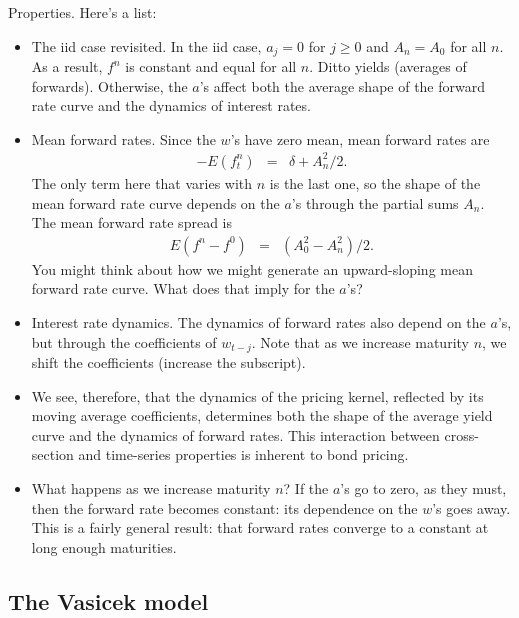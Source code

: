 \documentclass[11pt]{article}
\begin{document}
Properties.
Here's a list:
\begin{itemize}
\item The iid case revisited.
In the iid case, $a_j = 0$ for $j\geq 0$ and $A_n = A_0$ for all $n$.
As a result, $f^n$ is constant and equal for all $n$.
Ditto yields (averages of forwards).
Otherwise, the $a$'s affect both
the average shape of the forward rate curve
and the dynamics of interest rates.
\item Mean forward rates.
Since the $w$'s have zero mean, mean forward rates are
\begin{eqnarray*}
  -  E( f^n_t)
            &=&  \delta + A_n^2/2 .
\end{eqnarray*}
The only term here that varies with $n$ is the last one,
so the shape of the mean forward rate curve depends on the $a$'s through
the partial sums $A_n$.
The mean forward rate spread is
\begin{eqnarray}
    E( f^n - f^0 )
            &=&  (A_0^2 - A_n^2)/2 .
            \label{eq:vasicek-mean-forwards}
\end{eqnarray}
You might think about how we might generate an upward-sloping mean forward
rate curve.  What does that imply for the $a$'s?

\item Interest rate dynamics.
The dynamics of forward rates also depend on the $a$'s,
but through the coefficients of $w_{t-j}$.
Note that as we increase maturity $n$, we shift the coefficients (increase the subscript).

\item We see, therefore, that the dynamics of the pricing kernel,
reflected by its moving average coefficients,
determines both the shape of the average yield curve
and the dynamics of forward rates.
This interaction between cross-section and time-series properties
is inherent to bond pricing.

\item What happens as we increase maturity $n$?
If the $a$'s go to zero, as they must, then the forward rate becomes constant:
its dependence on the $w$'s goes away.
This is a fairly general result:  that forward rates converge
to a constant at long enough maturities.
\end{itemize}



\subsection*{The Vasicek model}
\end{document}
